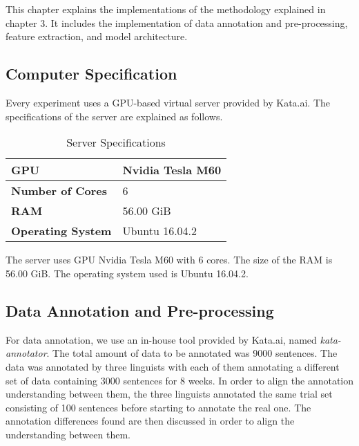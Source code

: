 \chapter{\babEmpat} \label{eksperimen}

This chapter explains the implementations of the methodology explained in chapter 3. It includes the implementation of data annotation and pre-processing, feature extraction, and model architecture.

\section{Computer Specification}
Every experiment uses a GPU-based virtual server provided by Kata.ai. The specifications of the server are explained as follows.

\begin{table}
	\centering
	\caption{Server Specifications}
	\begin{tabular}{|l|l|}
		\hline
		\textbf{GPU} & Nvidia Tesla M60 \\ \hline
		\textbf{Number of Cores} & 6 \\ \hline
		\textbf{RAM} & 56.00 GiB \\ \hline
		\textbf{Operating System} & Ubuntu 16.04.2 \\ \hline
	\end{tabular}
	\label{table:spesifikasi hardware}
\end{table}

The server uses GPU Nvidia Tesla M60 with 6 cores. The size of the RAM is 56.00 GiB. The operating system used is Ubuntu 16.04.2.

\section{Data Annotation and Pre-processing}
For data annotation, we use an in-house tool provided by Kata.ai, named \textit{kata-annotator}. The total amount of data to be annotated was 9000 sentences. The data was annotated by three linguists with each of them annotating a different set of data containing 3000 sentences for 8 weeks. In order to align the annotation understanding between them, the three linguists annotated the same trial set consisting of 100 sentences before starting to annotate the real one. The annotation differences found are then discussed in order to align the understanding between them.

